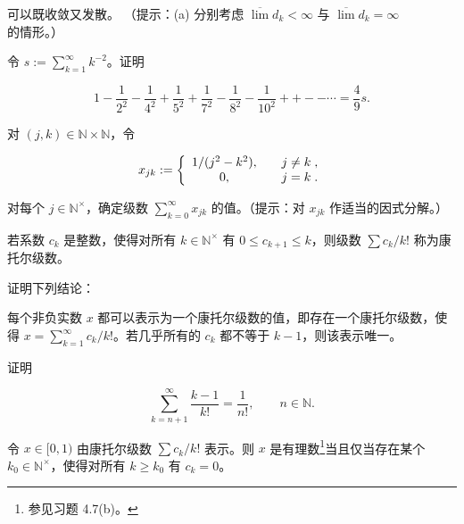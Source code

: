 \begin{exercises}
\begin{items}
可以既收敛又发散。
（提示：(a) 分别考虑 $ \overline{\lim} d_k < \infty $ 与 $ \overline{\lim} d_k = \infty $ 的情形。）

\end{items}

\item

令 $ s := \sum_{k=1}^{\infty} k^{-2} $。证明

\[
1-\frac{1}{2^{2}}-\frac{1}{4^{2}}+\frac{1}{5^{2}}+\frac{1}{7^{2}}-\frac{1}{8^{2}}-\frac{1}{10^{2}}++--\cdots=\frac{4}{9}s.
\]
\item

对 $ (j, k) \in \mathbb{N} \times \mathbb{N} $，令

\begin{equation*}
x_{j k}:=\left\{\begin{array}{c l}{1/(j^{2}-k^{2}),}&{\quad j\neq k\;,}\\ {0,}&{\quad j=k\;.}\\ \end{array}\right.
\end{equation*}

对每个 $ j \in \mathbb{N}^\times $，确定级数 $ \sum_{k=0}^{\infty} x_{jk} $ 的值。（提示：对 $ x_{jk} $ 作适当的因式分解。）

\item

若系数 $ c_k $ 是整数，使得对所有 $ k \in \mathbb{N}^\times $ 有 $ 0 \leq c_{k+1} \leq k $，则级数 $ \sum c_k/k! $ 称为康托尔级数。

证明下列结论：

\begin{items}
\item

每个非负实数 $x$ 都可以表示为一个康托尔级数的值，即存在一个康托尔级数，使得 $x = \sum_{k=1}^{\infty} c_k / k!$。若几乎所有的 $c_k$ 都不等于 $k-1$，则该表示唯一。

\item

证明

\[
\sum_{k=n+1}^{\infty}\frac{k-1}{k!}=\frac{1}{n!},\qquad n\in\mathbb{N}.
\]
\item

令 $ x \in [0,1) $ 由康托尔级数 $ \sum c_k/k! $ 表示。则 $ x $ 是有理数\footnote{参见习题 4.7(b)。}当且仅当存在某个 $ k_0 \in \mathbb{N}^\times $，使得对所有 $ k \geq k_0 $ 有 $ c_k = 0 $。

\end{items}


\end{exercises}
